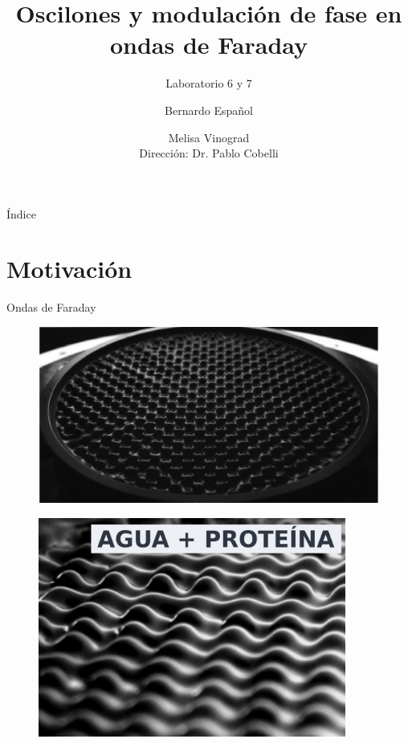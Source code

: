 \documentclass[aspectratio=169]{beamer}
\title{Oscilones y modulación de fase en ondas de Faraday}
\subtitle{Laboratorio 6 y 7}
\author{
	Bernardo Español \and Melisa Vinograd
	\texorpdfstring{\\ \vspace{0.1cm} Dirección: Dr. Pablo Cobelli}{}
}
\institute{Laboratorio de Turbulencia Geofísica, FLiP: Fluidos y Plasmas}
\date{}
\begin{document}
\begin{frame}
	\titlepage
\end{frame}

\begin{frame}{Índice}
	\tableofcontents
\end{frame}


\section{Motivación}

\begin{frame}{Ondas de Faraday}
	\begin{minipage}{0.65\textwidth}
	  \begin{figure}
		\includegraphics[width=1\textwidth]{figs/shats_snapshot_faraday_c.png}
	  \end{figure}
	\end{minipage} \hfill
	\begin{minipage}{0.3\textwidth}
	  \begin{figure}
	    \includegraphics[width=0.9\textwidth]{figs/shats_snapshot_water+prote.png}\\

\end{figure}
\end{minipage}
\end{frame}
\end{document}
